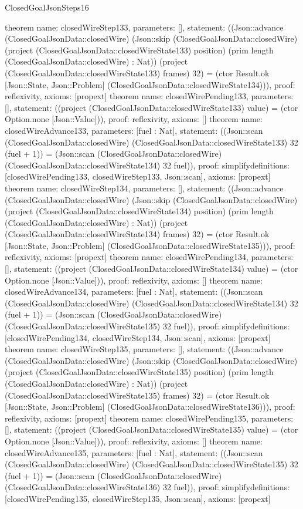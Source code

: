 \begin{lexlean}{ClosedGoalJsonSteps16}
\begin{semanticmodule}
{}
theorem{
 name: closedWireStep133, parameters: [],
 statement: ((Json::advance (ClosedGoalJsonData::closedWire) (Json::skip (ClosedGoalJsonData::closedWire) (project (ClosedGoalJsonData::closedWireState133) position) (prim length (ClosedGoalJsonData::closedWire) : Nat)) (project (ClosedGoalJsonData::closedWireState133) frames) 32) = (ctor Result.ok [Json::State, Json::Problem] (ClosedGoalJsonData::closedWireState134))), proof: reflexivity{}, axioms: [propext]
}
theorem{
 name: closedWirePending133, parameters: [],
 statement: ((project (ClosedGoalJsonData::closedWireState133) value) = (ctor Option.none [Json::Value])), proof: reflexivity{}, axioms: []
}
theorem{
 name: closedWireAdvance133, parameters: [fuel : Nat],
 statement: ((Json::scan (ClosedGoalJsonData::closedWire) (ClosedGoalJsonData::closedWireState133) 32 (fuel + 1)) = (Json::scan (ClosedGoalJsonData::closedWire) (ClosedGoalJsonData::closedWireState134) 32 fuel)), proof: simplify{definitions: [closedWirePending133, closedWireStep133, Json::scan]}, axioms: [propext]
}
theorem{
 name: closedWireStep134, parameters: [],
 statement: ((Json::advance (ClosedGoalJsonData::closedWire) (Json::skip (ClosedGoalJsonData::closedWire) (project (ClosedGoalJsonData::closedWireState134) position) (prim length (ClosedGoalJsonData::closedWire) : Nat)) (project (ClosedGoalJsonData::closedWireState134) frames) 32) = (ctor Result.ok [Json::State, Json::Problem] (ClosedGoalJsonData::closedWireState135))), proof: reflexivity{}, axioms: [propext]
}
theorem{
 name: closedWirePending134, parameters: [],
 statement: ((project (ClosedGoalJsonData::closedWireState134) value) = (ctor Option.none [Json::Value])), proof: reflexivity{}, axioms: []
}
theorem{
 name: closedWireAdvance134, parameters: [fuel : Nat],
 statement: ((Json::scan (ClosedGoalJsonData::closedWire) (ClosedGoalJsonData::closedWireState134) 32 (fuel + 1)) = (Json::scan (ClosedGoalJsonData::closedWire) (ClosedGoalJsonData::closedWireState135) 32 fuel)), proof: simplify{definitions: [closedWirePending134, closedWireStep134, Json::scan]}, axioms: [propext]
}
theorem{
 name: closedWireStep135, parameters: [],
 statement: ((Json::advance (ClosedGoalJsonData::closedWire) (Json::skip (ClosedGoalJsonData::closedWire) (project (ClosedGoalJsonData::closedWireState135) position) (prim length (ClosedGoalJsonData::closedWire) : Nat)) (project (ClosedGoalJsonData::closedWireState135) frames) 32) = (ctor Result.ok [Json::State, Json::Problem] (ClosedGoalJsonData::closedWireState136))), proof: reflexivity{}, axioms: [propext]
}
theorem{
 name: closedWirePending135, parameters: [],
 statement: ((project (ClosedGoalJsonData::closedWireState135) value) = (ctor Option.none [Json::Value])), proof: reflexivity{}, axioms: []
}
theorem{
 name: closedWireAdvance135, parameters: [fuel : Nat],
 statement: ((Json::scan (ClosedGoalJsonData::closedWire) (ClosedGoalJsonData::closedWireState135) 32 (fuel + 1)) = (Json::scan (ClosedGoalJsonData::closedWire) (ClosedGoalJsonData::closedWireState136) 32 fuel)), proof: simplify{definitions: [closedWirePending135, closedWireStep135, Json::scan]}, axioms: [propext]
}
\end{semanticmodule}
\end{lexlean}

